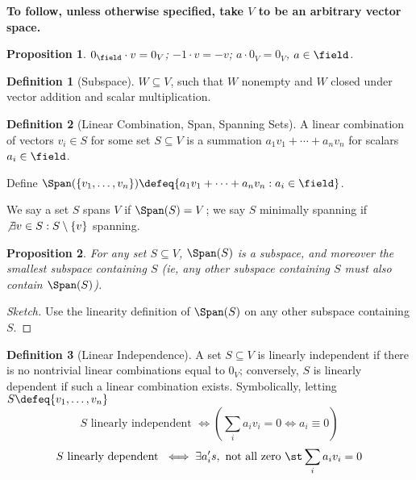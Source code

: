 \documentclass[12pt, oneside]{article}
\theoremstyle{definition}
\newtheorem{defn}{Definition}
\theoremstyle{plain}
\newtheorem{prop}{Proposition}
\theoremstyle{remark}
\begin{document}
\textbf{To follow, unless otherwise specified, take $V$ to be an arbitrary vector space.}

\begin{prop}
  $0_\field \cdot v = 0_V$; $-1 \cdot v = -v$; $a\cdot 0_V = 0_V$, $a\in \field$.
\end{prop}

\begin{defn}[Subspace]
  $W \subseteq V$, such that $W$ nonempty and $W$ closed under vector addition and scalar multiplication.
\end{defn}


\begin{defn}[Linear Combination, Span, Spanning Sets]
  A linear combination of vectors $v_i \in S$ for some set $S \subseteq V$ is a summation $a_1 v_1 + \cdots + a_n v_n$ for scalars $a_i \in \field$.

  Define $\Span(\{v_1, \dots, v_n\}) \defeq \{a_1 v_1 + \cdots + a_n v_n : a_i \in \field\}$.

  We say a set $S$ spans $V$ if $\Span(S) = V$; we say $S$ minimally spanning if $\not\exists v \in S : S\setminus \{v\}$ spanning. 
\end{defn}

\begin{prop}
  For any set $S \subseteq V$, $\Span(S)$ is a subspace, and moreover the smallest subspace containing $S$ (ie, any other subspace containing $S$ must also contain $\Span(S)$).
\end{prop}

\begin{proof}[Sketch]
  Use the linearity definition of $\Span(S)$ on any other subspace containing $S$.
\end{proof}

\begin{defn}[Linear Independence]
  A set $S \subseteq V$ is linearly independent if there is no nontrivial linear combinations equal to $0_V$; conversely, $S$ is linearly dependent if such a linear combination exists. Symbolically, letting $S \defeq \{v_1, \dots, v_n\}$ \[
  S\text{ linearly independent } \iff (\sum_i a_i v_i = 0 \iff a_i \equiv 0)\]\[
  S \text{ linearly dependent } \iff \exists a_i's, \text{ not all zero }\st \sum_i a_i v_i = 0
  \]
\end{defn}
\end{document}
